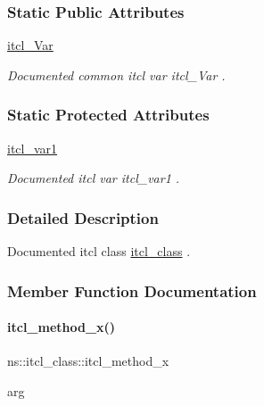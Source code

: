 \subsubsection*{Static Public Attributes}
\begin{DoxyCompactItemize}
\item 
\hypertarget{classns_1_1itcl__class_a8df46696ce554fed04d170932260fbb8}{}\label{classns_1_1itcl__class_a8df46696ce554fed04d170932260fbb8} 
\hyperlink{classns_1_1itcl__class_a8df46696ce554fed04d170932260fbb8}{itcl\+\_\+\+Var}
\begin{DoxyCompactList}\small\item\em Documented common itcl var {\ttfamily itcl\+\_\+\+Var} . \end{DoxyCompactList}\end{DoxyCompactItemize}
\subsubsection*{Static Protected Attributes}
\begin{DoxyCompactItemize}
\item 
\hypertarget{classns_1_1itcl__class_ae515e43ca6bb755d116416f94a13d344}{}\label{classns_1_1itcl__class_ae515e43ca6bb755d116416f94a13d344} 
\hyperlink{classns_1_1itcl__class_ae515e43ca6bb755d116416f94a13d344}{itcl\+\_\+var1}
\begin{DoxyCompactList}\small\item\em Documented itcl var {\ttfamily itcl\+\_\+var1} . \end{DoxyCompactList}\end{DoxyCompactItemize}


\subsubsection{Detailed Description}
Documented itcl class {\ttfamily \hyperlink{classns_1_1itcl__class}{itcl\+\_\+class}} . 

\subsubsection{Member Function Documentation}
\hypertarget{classns_1_1itcl__class_abc59160f823f3a6ec8c292c034aedbc3}{}\label{classns_1_1itcl__class_abc59160f823f3a6ec8c292c034aedbc3} 
\paragraph{\texorpdfstring{itcl\+\_\+method\+\_\+x()}{itcl\_method\_x()}}
{\footnotesize\ttfamily ns\+::itcl\+\_\+class\+::itcl\+\_\+method\+\_\+x\begin{DoxyParamCaption}\item[{}]{arg  }\end{DoxyParamCaption}}



